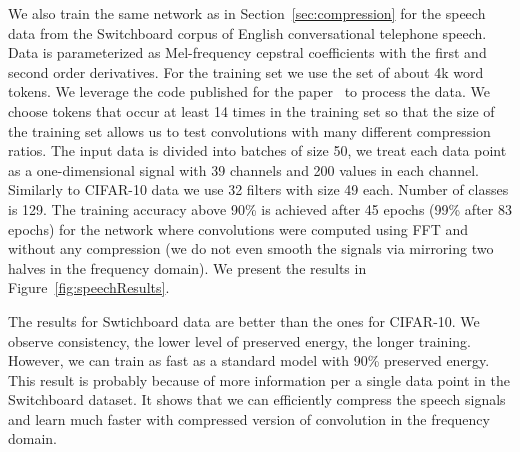 We also train the same network as in Section~\ref{sec:compression} for the speech data from the Switchboard corpus of English conversational telephone speech. Data is parameterized as Mel-frequency cepstral coefficients with the first and second order derivatives. For the training set we use the set of about 4k word tokens. We leverage the code published for the paper~\cite{KamperLivescu2016} to process the data. We choose tokens that occur at least 14 times in the training set so that the size of the training set allows us to test convolutions with many different compression ratios. The input data is divided into batches of size 50, we treat each data point as a one-dimensional signal with 39 channels and 200 values in each channel.
Similarly to CIFAR-10 data we use 32 filters with size 49 each. Number of classes is 129. The training accuracy above 90\% is achieved after 45 epochs (99\% after 83 epochs) for the network where convolutions were computed using FFT and without any compression (we do not even smooth the signals via mirroring two halves in the frequency domain). We present the results in Figure~\ref{fig:speechResults}.

The results for Swtichboard data are better than the ones for CIFAR-10. We observe consistency, the lower level of preserved energy, the longer training. However, we can train as fast as a standard model with 90\% preserved energy. This result is probably because of more information per a single data point in the Switchboard dataset. It shows that we can efficiently compress the speech signals and learn much faster with compressed version of convolution in the frequency domain.

\fi